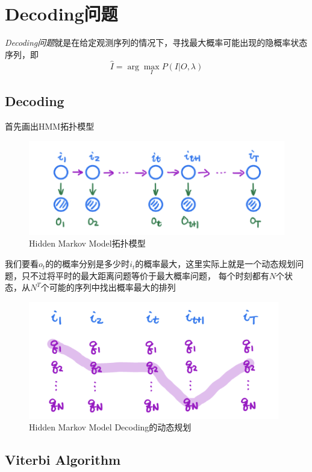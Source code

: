 \chapter{Decoding问题}

\textsl{Decoding问题}就是在给定观测序列的情况下，寻找最大概率可能出现的隐概率状态序列，即
\begin{equation}
    \hat{I}=\arg\max_{I}P(I|O,\lambda)
\end{equation}

\section{Decoding}

首先画出HMM拓扑模型

\begin{figure}[H]
    \centering
    \includegraphics[scale=0.6]{figures/Hidden-Markov-model-Topology.png}
    \caption{Hidden Markov Model拓扑模型}
\end{figure}

我们要看$o_t$的的概率分别是多少时$i_t$的概率最大，这里实际上就是一个动态规划问题，只不过将平时的最大距离问题等价于最大概率问题，
每个时刻都有$N$个状态，从$N^T$个可能的序列中找出概率最大的排列

\begin{figure}[H]
    \centering
    \includegraphics[scale=0.6]{figures/动态规划问题.png}
    \caption{Hidden Markov Model Decoding的动态规划}
\end{figure}


\section{Viterbi Algorithm}

